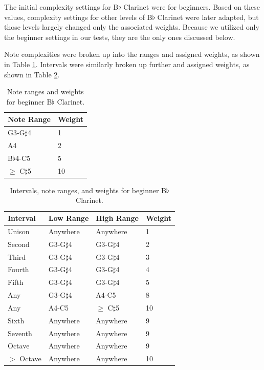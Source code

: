 \documentclass[12pt]{report}
\begin{document}
The initial complexity settings for B$\flat$ Clarinet were for beginners. Based on these values, complexity settings for other levels of B$\flat$ Clarinet were later adapted, but those levels largely changed only the associated weights. Because we utilized only the beginner settings in our tests, they are the only ones discussed below.

Note complexities were broken up into the ranges and assigned weights, as shown in Table \ref{table:notes}. Intervals were similarly broken up further and assigned weights, as shown in Table \ref{table:intervals}.  

\begin{table}[t]
	\centering
	\caption{Note ranges and weights for beginner B$\flat$ Clarinet.}
    \begin{tabular}{| l | l |}
        \hline
        Note Range & Weight \\ \hline
        G3-G$\sharp$4 & 1 \\ \hline
        A4 & 2 \\ \hline
        B$\flat$4-C5 & 5 \\ \hline
        $\geq$ C$\sharp$5 & 10 \\
        \hline
    \end{tabular}
	\label{table:notes}
\end{table}

\begin{table}[t]
	\centering
	\caption{Intervals, note ranges, and weights for beginner B$\flat$ Clarinet.}
    \begin{tabular}{| l | l | l | l |}
        \hline
        Interval & Low Range & High Range & Weight \\ \hline
        Unison & Anywhere & Anywhere & 1 \\ \hline
        Second & G3-G$\sharp$4 & G3-G$\sharp$4 & 2 \\ \hline
        Third & G3-G$\sharp$4 & G3-G$\sharp$4 & 3 \\ \hline
        Fourth & G3-G$\sharp$4 & G3-G$\sharp$4 & 4 \\ \hline
        Fifth & G3-G$\sharp$4 & G3-G$\sharp$4 & 5 \\ \hline
        Any & G3-G$\sharp$4 & A4-C5 & 8 \\ \hline
        Any & A4-C5 & $\geq$ C$\sharp$5 & 10 \\ \hline
        Sixth & Anywhere & Anywhere & 9 \\ \hline
        Seventh & Anywhere & Anywhere & 9 \\ \hline
        Octave & Anywhere & Anywhere & 9 \\ \hline
        $>$ Octave & Anywhere & Anywhere & 10 \\
        \hline
    \end{tabular}
	\label{table:intervals}
\end{table}
\end{document}
